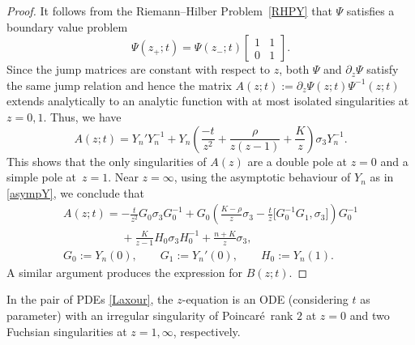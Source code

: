 \documentclass[10pt,a4paper]{amsart}
\numberwithin{equation}{section}
\theoremstyle{definition}
\def\le{\left}
\def\ri{\right}
\def\s{\sigma}
\def\pa{\partial}
\begin{document}
\begin{proof}
It follows from the Riemann--Hilber Problem~\ref{RHPY} that $\Psi$ satisfies a boundary value problem
\[%
\Psi(z_+;t) = \Psi(z_-;t) \begin{bmatrix}1 & 1 \\ 0& 1\end{bmatrix}.
\]
Since the jump matrices are constant with respect to $z$, both $\Psi$ and $\pa_z \Psi$ satisfy the same jump relation and hence the matrix
$
A(z;t):= \pa_z\Psi(z;t) \Psi^{-1}(z;t)
$
extends analytically to an analytic function with at most isolated singularities at $z=0,1$.
Thus, we have
\[
A(z;t) = Y_n' Y_n^{-1} + Y_n\le(\frac {-t}{z^2} + \frac{{ {\rho}}}{z(z-1)} + \frac {{ {K}}	}z \ri)\s_3 Y_n^{-1}.
\]
This shows that the only singularities of $A(z)$ are a double pole at $z=0$ and a simple pole at~${z=1}$. Near $z=\infty$, using the asymptotic behaviour of $Y_n$ as in \eqref{asympY}, we conclude that
\begin{gather*}
A(z;t) =-\frac t {z^2} G_0 \s_3 G_0^{-1} + G_0\le(\frac{{ {K}}-{ {\rho}}}z\s_3 - \frac t z \Big[G_0^{-1}G_1, \s_3\Big]\ri) G_0^{-1} \\
\phantom{A(z;t) =}{}+\frac {{ {K}}}{z-1} H_0 \s_3 H_0^{-1} + \frac{n+{ {K}}}z \s_3,\\
G_0 := Y_n(0), \qquad G_1:= Y_n'(0), \qquad H_0 := Y_n(1).
\end{gather*}
A similar argument produces the expression for $B(z;t)$.
\end{proof}

In the pair of PDEs \eqref{Laxour}, the $z$-equation is an ODE (considering $t$ as parameter) with an irregular singularity of Poincar\'e\ rank $2$ at $z=0$ and two Fuchsian singularities at $z=1,\infty$, respectively.
\end{document}
